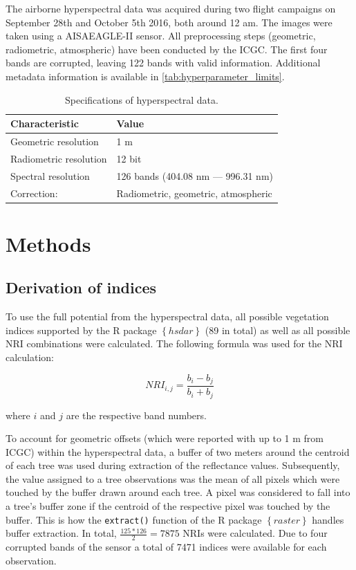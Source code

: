 \documentclass[letterpaper, peerreview]{IEEEtran}
\begin{document}
\noindent The airborne hyperspectral data was acquired during two flight campaigns on September 28th and October 5th 2016, both around 12 am.
The images were taken using a AISAEAGLE-II sensor.
All preprocessing steps (geometric, radiometric, atmospheric) have been conducted by the \ac{ICGC}.
The first four bands are corrupted, leaving 122 bands with valid information.
Additional metadata information is available in \autoref{tab:hyperparameter_limits}.


\begin{table}[t]
\centering
\caption[t]{Specifications of hyperspectral data.}
\begingroup
\begin{tabular}{ll}
	\\
	Characteristic         & Value                               \\
	\toprule
	Geometric resolution   & 1 m                                 \\
	Radiometric resolution & 12 bit                              \\
	Spectral resolution    & 126 bands (404.08 nm --- 996.31 nm)   \\
	Correction:            & Radiometric, geometric, atmospheric
\end{tabular}
\endgroup\label{tab:hyperparameter_limits}
\end{table}

\section{Methods}

\subsection{Derivation of indices}
\noindent To use the full potential from the hyperspectral data, all possible vegetation indices supported by the R package $\left\{hsdar\right\}$ (89 in total) as well as all possible \ac{NRI} combinations were calculated.
The following formula was used for the NRI calculation:

\begin{equation}
	NRI_{i,j} = \frac{b_{i} - b_{j}}{b_{i} + b_{j}}
\end{equation}

\noindent
where \(i\) and \(j\) are the respective band numbers.

\bigbreak{}

\noindent To account for geometric offsets (which were reported with up to 1 m from \ac{ICGC}) within the hyperspectral data, a buffer of two meters around the centroid of each tree was used during extraction of the reflectance values.
Subsequently, the value assigned to a tree observations was the mean of all pixels which were touched by the buffer drawn around each tree.
A pixel was considered to fall into a tree's buffer zone if the centroid of the respective pixel was touched by the buffer.
This is how the \texttt{extract()} function of the R package $\left\{raster\right\}$ handles buffer extraction.
In total, \(\frac{125*126}{2} = 7875\) NRIs were calculated.
Due to four corrupted bands of the sensor a total of 7471 indices were available for each observation.
\end{document}
